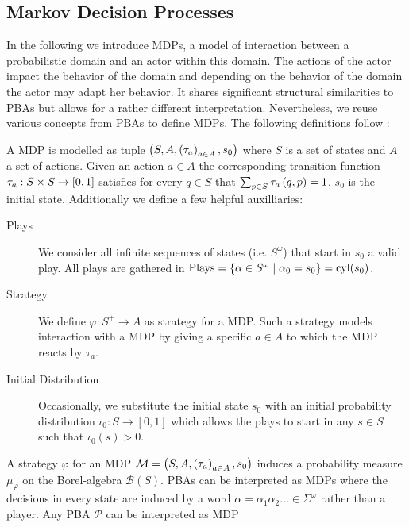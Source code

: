 \subsection{Markov Decision Processes}
In the following we introduce \acp{MDP}, a model of interaction between a 
probabilistic domain and an actor within this domain. The actions of the actor
impact the behavior of the domain and depending on the behavior of the domain
the actor may adapt her behavior. It shares significant structural similarities
to \acp{PBA} but allows for a rather different interpretation. Nevertheless, we
reuse various concepts from \acp{PBA} to define \acp{MDP}. The following 
definitions follow \cite{RandAutoInfTrees}:
\begin{definition}
  A \acl*{MDP} is modelled as tuple
  $\left(S, A, \left(\tau_{a}\right)_{a\in A}, s_{0}\right)$ where $S$ is a set of states
  and $A$ a set of actions. Given an action $a\in A$ the corresponding
  transition function $\tau_{a}:S\times S\rightarrow \left[0,1\right]$ satisfies
  for every $q\in S$ that $\sum_{p\in S}\tau_{a}\left(q,p\right) = 1$.
  $s_{0}$ is the initial state. Additionally we define a few helpful
  auxilliaries:
  \begin{description}
    \item [Plays] We consider all infinite sequences of states
      (i.e. $S^{\omega}$) that start in $s_{0}$ a valid play. All plays
      are gathered in $\operatorname{Plays} = \left\{
        \alpha\in S^{\omega}\mid \alpha_{0} = s_{0}\right\} = \operatorname{cyl}(s_{0})$.
    \item [Strategy] We define $\varphi:S^{+}\rightarrow A$ as strategy for
      a \ac{MDP}. Such a strategy models interaction with a \ac{MDP} by
      giving a specific $a\in A$ to which the \ac{MDP} reacts by $\tau_{a}$.
    \item [Initial Distribution] Occasionally, we substitute the initial state
      $s_{0}$ with an initial probability distribution
      $\iota_{0}:S\rightarrow[0,1]$ which allows the plays to start in any
      $s\in S$ such that $\iota_{0}(s) > 0$.
  \end{description}
  \label{def:mdp}
\end{definition}
A strategy $\varphi$ for an \ac{MDP}
$\mathcal{M} = \left(S, A, \left(\tau_{a}\right)_{a\in A}, s_{0}\right)$ induces a 
probability measure $\mu_{\varphi}$ on the Borel-algebra $\mathcal{B}(S)$. 
\acp{PBA} can be interpreted as \acp{MDP} where the decisions in every state
are induced by a word $\alpha = \alpha_{1}\alpha_{2}\dots\in\Sigma^{\omega}$
rather than a player. Any \ac{PBA} $\mathcal{P}$ can be interpreted as \ac{MDP}
